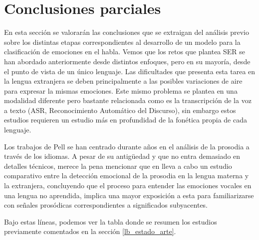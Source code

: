 \documentclass[11pt,a4paper,spanish]{book}
\begin{document}
	\section{Conclusiones parciales}
	En esta sección se valorarán las conclusiones que se extraigan del análisis previo sobre los distintas etapas correspondientes al desarrollo de un modelo para la clasificación de emociones en el habla. Vemos que los retos que plantea SER se han abordado anteriormente desde distintos enfoques, pero en su mayoría, desde el punto de vista de un único lenguaje. Las dificultades que presenta esta tarea en la lengua extranjera se deben principalmente a las posibles variaciones de aire para expresar la mismas emociones. Este mismo problema se plantea en una modalidad diferente pero bastante relacionada como es la transcripción de la voz a texto (ASR, Reconocimiento Automático del Discurso), sin embargo estos estudios requieren un estudio más en profundidad de la fonética propia de cada lenguaje.
	
	Los trabajos de Pell se han centrado durante años en el análisis de la prosodia a través de los idiomas. A pesar de su antigüedad y que no entra demasiado en detalles técnicos, merece la pena mencionar que en \cite{Pell2008} lleva a cabo un estudio comparativo entre la detección emocional de la prosodia en la lengua materna y la extranjera, concluyendo que el proceso para entender las emociones vocales en una lengua no aprendida, implica una mayor exposición a esta para familiarizarse con señales prosódicas correspondientes a significados subyacentes.\hfill \break
	
	Bajo estas líneas, podemos ver la tabla donde se resumen los estudios previamente comentados en la sección \ref{lb_estado_arte}.\\
\end{document}
